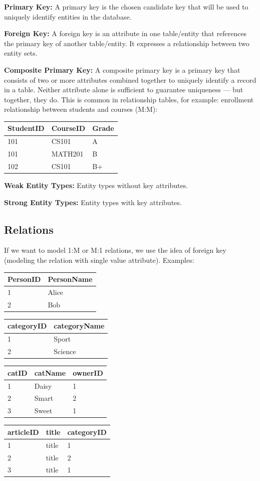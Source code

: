 \documentclass{article}
\begin{document}
\textbf{Primary Key: }A primary key is the chosen candidate key that will be used to uniquely identify entities in the database.

\textbf{Foreign Key: }A foreign key is an attribute in one table/entity that references the primary key of another table/entity.
It expresses a relationship between two entity sets.

\textbf{Composite Primary Key: }
A composite primary key is a primary key that consists of two or more attributes combined together to uniquely identify a record in a table. Neither attribute alone is sufficient to guarantee uniqueness — but together, they do. This is common in relationship tables, for example: enrollment relationship between students and courses (M:M):

\begin{tabular}{|l|l|l|} \hline
    StudentID & CourseID & Grade \\ \hline
    101&CS101&A \\ \hline
    101&MATH201&B \\ \hline
    102&CS101&B+ \\ \hline
\end{tabular}

\textbf{Weak Entity Types: }Entity types without key attributes.

\textbf{Strong Entity Types: }Entity types with key attributes.
\subsection*{Relations}
If we want to model 1:M or M:1 relations, we use the idea of foreign key (modeling the relation with single value attribute). Examples:

\begin{tabular}{|l|l|} \hline
    PersonID & PersonName \\ \hline
    1&Alice\\ \hline
    2&Bob \\ \hline
\end{tabular}
\begin{tabular}{|l|l|} \hline
    categoryID & categoryName \\ \hline
    1&Sport\\ \hline
    2&Science \\ \hline
\end{tabular}
\begin{tabular}{|l|l|l|} \hline
    catID & catName & ownerID \\ \hline
    1&Daisy&1\\ \hline
    2&Smart&2 \\ \hline
    3&Sweet&1 \\ \hline
\end{tabular}
\begin{tabular}{|l|l|l|} \hline
    articleID & title & categoryID \\ \hline
    1&title&1\\ \hline
    2&title&2 \\ \hline
    3&title&1 \\ \hline
\end{tabular}
\end{document}
